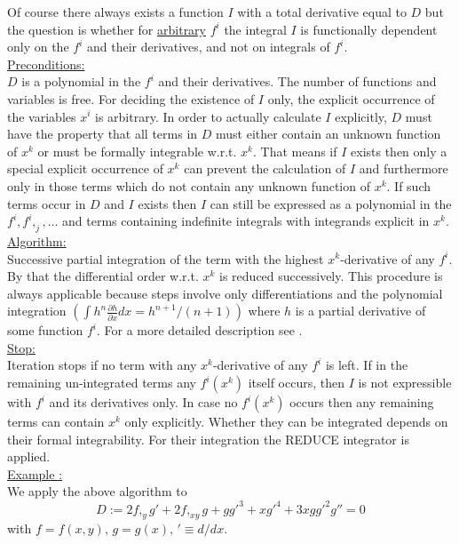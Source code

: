 Of course there
always exists a function $I$ with a total derivative equal to $D$ but
the question is whether for \underline{arbitrary} $f^i$ the integral
$I$ is functionally dependent only on the $f^i$ and their derivatives,
and not on integrals of $f^i.$ \\
\underline{Preconditions:} \\
$D$ is a polynomial in the $f^i$ and their derivatives. The number of
functions and variables is free.
For deciding the existence of $I$ only, the explicit occurrence of the
variables $x^i$ is arbitrary. In order to actually
calculate $I$ explicitly, $D$ must have the property that all terms in $D$
must either contain an unknown function of $x^k$ or
must be formally integrable w.r.t. $x^k.$
That means if $I$ exists then
only a special explicit occurrence of $x^k$ can prevent the
calculation of $I$
and furthermore only in those terms which do not contain
any unknown function of $x^k.$
If such terms occur in $D$ and $I$ exists then $I$ can still be expressed
as a polynomial in the $f^i, f^i,_j, \ldots$ and terms containing
indefinite integrals with integrands explicit in $x^k.$ \\
\underline{Algorithm:} \\
Successive partial integration of the term with the highest
$x^k$-derivative of any $f^i.$ By that the
differential order w.r.t. $x^k$ is reduced
successively. This procedure is always applicable because steps involve only
differentiations and the polynomial
integration $(\int h^n\frac{\partial h}{\partial x}dx =
h^{n+1}/(n+1))$ where $h$ is a partial derivative of some function
$f^i.$ For a more detailed description see \cite{WoInt}.\\
\underline{Stop:} \\
Iteration stops if no term with any $x^k$-derivative of any $f^i$ is left.
If in the remaining un-integrated terms any $f^i(x^k)$ itself occurs,
then $I$ is not expressible with $f^i$ and its derivatives only.  In
case no $f^i(x^k)$ occurs then any remaining terms can contain $x^k$ only
explicitly. Whether they can be integrated depends on their formal
integrability. For their integration the REDUCE integrator is applied. \\
\underline{Example :} \\
We apply the above algorithm to
\begin{equation}
D := 2f,_yg' + 2f,_{xy}g + gg'^3 + xg'^4 + 3xgg'^2g'' = 0
\label{D}
\end{equation}
with $f = f(x,y), \, g = g(x), \, '\equiv d/dx.$
